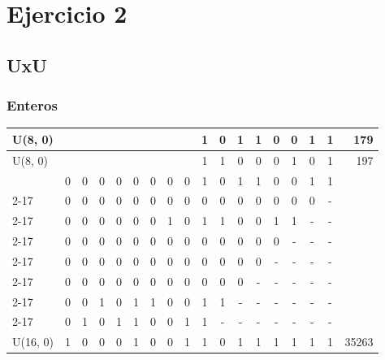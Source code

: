 \section{Ejercicio 2}
\newcommand{\ft}[1]{\color[HTML]{CBCEFB} #1}

\subsection{UxU}

\subsubsection{Enteros}
\begin{table}[H]
    \centering
    \begin{tabular}{|l|c|c|c|c|c|c|c|c|c|c|c|c|c|c|c|c|r|}
                                                                                                                                    \hline
        U(8, 0)  &        &        &        &        &        &        &        &        & 1 & 0 & 1 & 1 & 0 & 0 & 1 & 1 &   179 \\ \hline
        U(8, 0)  &        &        &        &        &        &        &        &        & 1 & 1 & 0 & 0 & 0 & 1 & 0 & 1 &   197 \\ \hline
                 & \ft{0} & \ft{0} & \ft{0} & \ft{0} & \ft{0} & \ft{0} & \ft{0} & \ft{0} & 1 & 0 & 1 & 1 & 0 & 0 & 1 & 1 &       \\ \cline{2-17}
                 & \ft{0} & \ft{0} & \ft{0} & \ft{0} & \ft{0} & \ft{0} & \ft{0} & 0      & 0 & 0 & 0 & 0 & 0 & 0 & 0 & - &       \\ \cline{2-17}
                 & \ft{0} & \ft{0} & \ft{0} & \ft{0} & \ft{0} & \ft{0} &      1 & 0      & 1 & 1 & 0 & 0 & 1 & 1 & - & - &       \\ \cline{2-17}
                 & \ft{0} & \ft{0} & \ft{0} & \ft{0} & \ft{0} & 0      &      0 & 0      & 0 & 0 & 0 & 0 & 0 & - & - & - &       \\ \cline{2-17}
                 & \ft{0} & \ft{0} & \ft{0} & \ft{0} &      0 & 0      &      0 & 0      & 0 & 0 & 0 & 0 & - & - & - & - &       \\ \cline{2-17}
                 & \ft{0} & \ft{0} & \ft{0} & 0      &      0 & 0      &      0 & 0      & 0 & 0 & 0 & - & - & - & - & - &       \\ \cline{2-17}
                 & \ft{0} & \ft{0} &      1 & 0      &      1 & 1      &      0 & 0      & 1 & 1 & - & - & - & - & - & - &       \\ \cline{2-17}
                 & \ft{0} & 1      &      0 & 1      &      1 & 0      &      0 & 1      & 1 & - & - & - & - & - & - & - &       \\ \hline
        U(16, 0) &      1 & 0      &      0 & 0      &      1 & 0      &      0 & 1      & 1 & 0 & 1 & 1 & 1 & 1 & 1 & 1 & 35263 \\ \hline
    \end{tabular}
\end{table}

